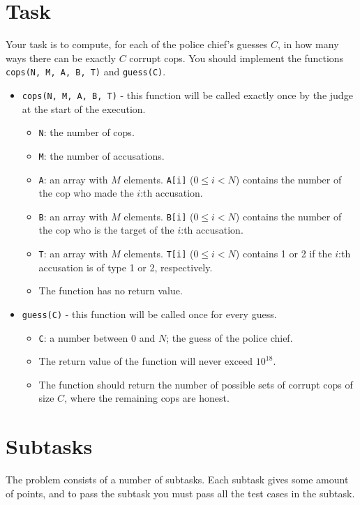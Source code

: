 \section*{Task}
Your task is to compute, for each of the police chief's guesses $C$, in how many ways there can be exactly $C$ corrupt cops.
You should implement the functions \texttt{cops(N, M, A, B, T)} and \texttt{guess(C)}.
\begin{itemize}
  \item \texttt{cops(N, M, A, B, T)} - this function will be called exactly once by the judge at the start of the execution.
  \begin{itemize}
    \item \texttt{N}: the number of cops.
    \item \texttt{M}: the number of accusations.
    \item \texttt{A}: an array with $M$ elements. \texttt{A[i]} ($0 \le i < N$) contains the number of the cop who made the $i$:th accusation.
    \item \texttt{B}: an array with $M$ elements. \texttt{B[i]} ($0 \le i < N$) contains the number of the cop who is the target of the $i$:th accusation.
    \item \texttt{T}: an array with $M$ elements. \texttt{T[i]} ($0 \le i < N$) contains 1 or 2 if the $i$:th accusation is of type 1 or 2, respectively.
		\item The function has no return value.
  \end{itemize}
\end{itemize}

\begin{itemize}
  \item \texttt{guess(C)} - this function will be called once for every guess.
  \begin{itemize}
    \item \texttt{C}: a number between $0$ and $N$; the guess of the police chief.
    \item The return value of the function will never exceed $10^{18}$.
		\item The function should return the number of possible sets of corrupt cops of size $C$, where the remaining cops are honest.
  \end{itemize}
\end{itemize}

\section*{Subtasks}
The problem consists of a number of subtasks. Each subtask gives some amount of points, and to pass
the subtask you must pass all the test cases in the subtask.

